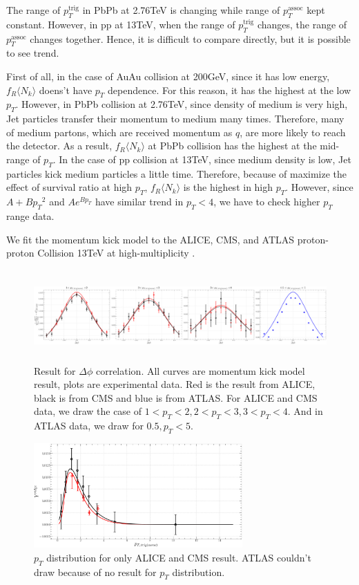 \documentclass[12pt]{article}
\begin{document}
The range of $p_T^{\text{trig}}$ in PbPb at 2.76TeV is changing while range of $p_T^{\text{assoc}}$ kept constant.
However, in pp at 13TeV, when the range of $p_T^{\text{trig}}$ changes, the range of $p_T^{\text{assoc}}$ changes together.
Hence, it is difficult to compare directly, but it is possible to see trend.

First of all, in the case of AuAu collision at 200GeV, since it has low energy, $f_R \langle N_k \rangle$ doens't have $p_T$ dependence.
For this reason, it has the highest at the low $p_T$.
However, in PbPb collision at 2.76TeV, since density of medium is very high, Jet particles transfer their momentum to medium many times.
Therefore, many of medium partons, which are received momentum as $q$, are more likely to reach the detector.
As a result, $f_R \langle N_k \rangle$ at PbPb collision has the highest at the mid-range of $p_T$.
In the case of pp collision at 13TeV, since medium density is low, Jet particles kick medium particles a little time.
Therefore, because of maximize the effect of survival ratio at high $p_T$, $f_R \langle N_k \rangle$ is the highest in high $p_T$.
However, since $A+B{p_T}^2$ and $Ae^{Bp_T}$ have similar trend in $p_T<4$, we have to check higher $p_T$ range data.

We fit the momentum kick model to the ALICE, CMS, and ATLAS proton-proton Collision 13TeV at high-multiplicity \cite{alice, cms, atlas}. 

\begin{figure}[ht]
\centering
\includegraphics[width=16cm, height=3.5cm]{Paper_phiCorr}
\caption{Result for $\Delta \phi$ correlation. All curves are momentum kick model result, plots are experimental data.
Red is the result from ALICE, black is from CMS and blue is from ATLAS.
For ALICE and CMS data, we draw the case of $1<p_T<2, 2<p_T<3, 3<p_T<4$. And in ATLAS data, we draw for $0.5,p_T<5$.}
\label{figure:phicorr}
\end{figure}

\begin{figure}[ht]
\centering
\includegraphics[width=8cm, height=4cm]{Paper_pTdis}
\caption{$p_T$ distribution for only ALICE and CMS result. ATLAS couldn’t draw because of no result for $p_T$ distribution.}
\label{figure:pTdis}
\end{figure}
\end{document}
